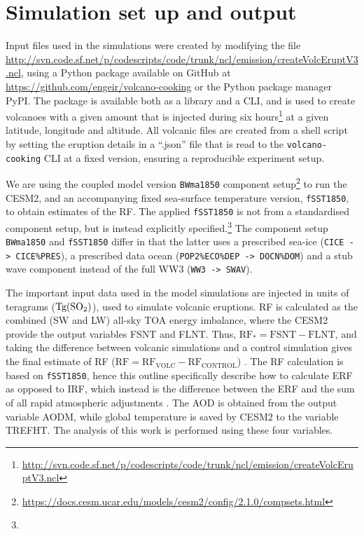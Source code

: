 \documentclass[draft]{agujournal2019}
\newcommand{\iso}[1][i]{{#1}njected \ce{SO2}}
\begin{document}
\section{Simulation set up and output}

Input files used in the simulations were created by modifying the file
\url{http://svn.code.sf.net/p/codescripts/code/trunk/ncl/emission/createVolcEruptV3.ncl},
using a Python package available on GitHub at
\url{https://github.com/engeir/volcano-cooking} or the Python package manager PyPI\@.
The package is available both as a library and a CLI, and is used to create volcanoes
with a given  amount that is injected during six
hours\footnote{\url{http://svn.code.sf.net/p/codescripts/code/trunk/ncl/emission/createVolcEruptV3.ncl}}
at a given latitude, longitude and altitude. All volcanic  files are created
from a shell script by setting the eruption details in a ``.json'' file that is read to
the \texttt{volcano-cooking} CLI at a fixed version, ensuring a reproducible experiment
setup.

We are using the coupled model version \texttt{BWma1850} component
setup\footnote{\url{https://docs.cesm.ucar.edu/models/cesm2/config/2.1.0/compsets.html}}
to run the CESM2, and an accompanying fixed sea-surface temperature version,
\texttt{fSST1850}, to obtain estimates of the RF. The applied \texttt{fSST1850} is
not from a standardised component setup, but is instead explicitly
specified.\footnote{\fssturl} The component setup \texttt{BWma1850} and
\texttt{fSST1850} differ in that the latter uses a prescribed sea-ice (\texttt{CICE ->
CICE\%PRES}), a prescribed data ocean (\texttt{POP2\%ECO\%DEP -> DOCN\%DOM}) and a stub
wave component instead of the full WW3 (\texttt{WW3 -> SWAV}).

The important input data used in the model simulations are \iso{} in units of teragrams
(\(\si{\tera\gram(\ce{SO2})}\)), used to simulate volcanic eruptions. RF is
calculated as the combined (SW and LW) all-sky TOA energy imbalance,
where the CESM2 provide the output variables FSNT and FLNT. Thus,
\(\mathrm{RF_*}= \mathrm{FSNT} - \mathrm{FLNT}\), and taking the difference between
volcanic simulations and a control simulation gives the final estimate of RF
(\(\mathrm{RF}=\mathrm{RF_{VOLC}}-\mathrm{RF_{CONTROL}}\)) \cite{marshall2020}. The
RF calculation is based on \texttt{fSST1850}, hence this outline specifically
describe how to calculate ERF as opposed to IRF, which instead is the
difference between the ERF and the sum of all rapid atmospheric adjustments
\cite{marshall2020,smith2018}. The AOD is obtained from the output variable
AODM, while global temperature is saved by CESM2 to the variable
TREFHT. The analysis of this work is performed using these four variables. 
\end{document}
